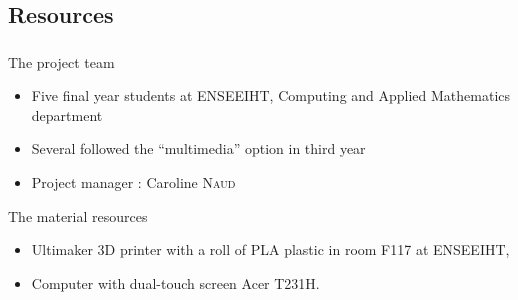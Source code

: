 \documentclass{beamer}
\begin{document}
\subsection{Resources}
\begin{frame}
	\frametitle{}
	
	\begin{block}{The project team}
		\begin{itemize}
		\item Five final year students at ENSEEIHT, Computing and Applied Mathematics department
		\item Several followed the “multimedia” option in third year
		\item Project manager : Caroline \textsc{Naud}
		\end{itemize}
    \end{block}
    
    \begin{block}{The material resources}
    	\begin{itemize}
    	\item Ultimaker 3D printer with a roll of PLA plastic in room F117 at ENSEEIHT,
    	\item Computer with dual-touch screen Acer T231H.
		\end{itemize}
    \end{block}
      
\end{frame}
\end{document}
